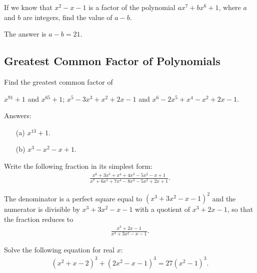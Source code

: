 \documentclass[12pt,a4paper]{memoir}
\theoremstyle{definition}
\begin{document}
\begin{question}[name={2017 Ecuador}]
	If we know that $x^2-x-1$ is a factor of the polynomial $ax^7+bx^6+1$, where $a$ and $b$ are integers, find the value of $a-b$.
\end{question}

\begin{solution}
	The answer is $a-b=21$.
\end{solution}

\subsection{Greatest Common Factor of Polynomials}


\begin{question}
	Find the greatest common factor of
	\begin{tasks}
		\task $x^{91}+1$ and $x^{65}+1$;
		\task $x^5-3x^3+x^2+2x-1$ and $x^6-2x^5+x^4-x^2+2x-1$.
	\end{tasks}
\end{question}

\begin{solution}[name=Solution by Parviz Shahriari]
	Answers:
	\begin{itemize}
		\item[(a)] $x^{13}+1$. 
		\item[(b)] $x^3-x^2-x+1$. 
	\end{itemize}
\end{solution}

\begin{question}
	Write the following fraction in its simplest form:
	\begin{align*}
		\frac{x^6+3x^5+x^4+4x^3-5x^2-x+1}{x^7+6x^5+7x^4-8x^3-5x^2+2x+1}.
	\end{align*}
\end{question}

\begin{solution}[name=Solution by Parviz Shahriari]
	The denominator is a perfect square equal to $(x^3+3x^2-x-1)^2$ and the numerator is divisible by $x^3+3x^2-x-1$ with a quotient of $x^3+2x-1$, so that the fraction reduces to
	\begin{align*}
		\frac{x^3+2x-1}{x^3+3x^2-x-1}.
	\end{align*}
\end{solution}


\begin{question}
	Solve the following equation for real $x$:
	\begin{align*}
		(x^2+x-2)^3 + (2x^2-x-1)^3 = 27(x^2-1)^3.
	\end{align*}
\end{question}
\end{document}
